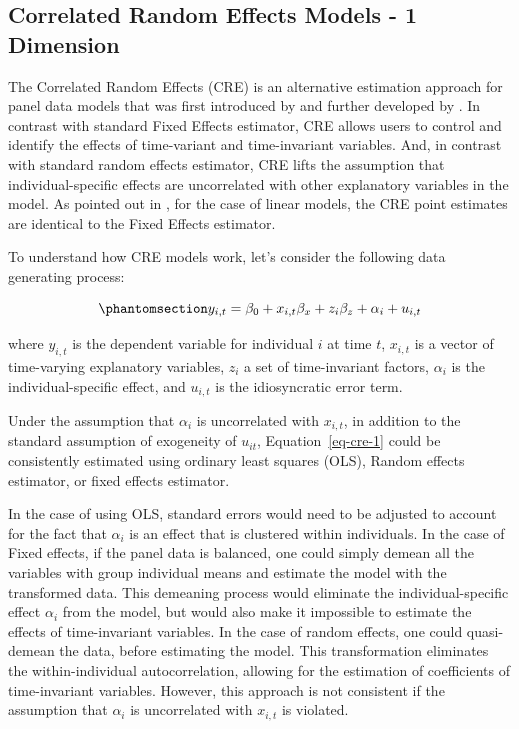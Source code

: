\documentclass[bib]{statapress}
\begin{document}
\subsection{Correlated Random Effects Models - 1
Dimension}\label{correlated-random-effects-models---1-dimension}

The Correlated Random Effects (CRE) is an alternative estimation
approach for panel data models that was first introduced by
\citet{mundlak1978pooling} and further developed by
\citet{chamberlain1982multivariate}. In contrast with standard Fixed
Effects estimator, CRE allows users to control and identify the effects
of time-variant and time-invariant variables. And, in contrast with
standard random effects estimator, CRE lifts the assumption that
individual-specific effects are uncorrelated with other explanatory
variables in the model. As pointed out in
\citet{wooldridge2010econometric}, for the case of linear models, the
CRE point estimates are identical to the Fixed Effects estimator.

To understand how CRE models work, let's consider the following data
generating process:

\begin{equation}\phantomsection\label{eq-cre-1}{y_{i,t} = \beta_0 + x_{i,t}\beta_x + z_{i}\beta_z  + \alpha_i + u_{i,t}
}\end{equation}

where \(y_{i,t}\) is the dependent variable for individual \(i\) at time
\(t\), \(x_{i,t}\) is a vector of time-varying explanatory variables,
\(z_i\) a set of time-invariant factors, \(\alpha_i\) is the
individual-specific effect, and \(u_{i,t}\) is the idiosyncratic error
term.

Under the assumption that \(\alpha_i\) is uncorrelated with \(x_{i,t}\),
in addition to the standard assumption of exogeneity of \(u_{it}\),
Equation~\ref{eq-cre-1} could be consistently estimated using ordinary
least squares (OLS), Random effects estimator, or fixed effects
estimator.

In the case of using OLS, standard errors would need to be adjusted to
account for the fact that \(\alpha_i\) is an effect that is clustered
within individuals. In the case of Fixed effects, if the panel data is
balanced, one could simply demean all the variables with group
individual means and estimate the model with the transformed data. This
demeaning process would eliminate the individual-specific effect
\(\alpha_i\) from the model, but would also make it impossible to
estimate the effects of time-invariant variables. In the case of random
effects, one could quasi-demean the data, before estimating the model.
This transformation eliminates the within-individual autocorrelation,
allowing for the estimation of coefficients of time-invariant variables.
However, this approach is not consistent if the assumption that
\(\alpha_i\) is uncorrelated with \(x_{i,t}\) is violated.
\end{document}
